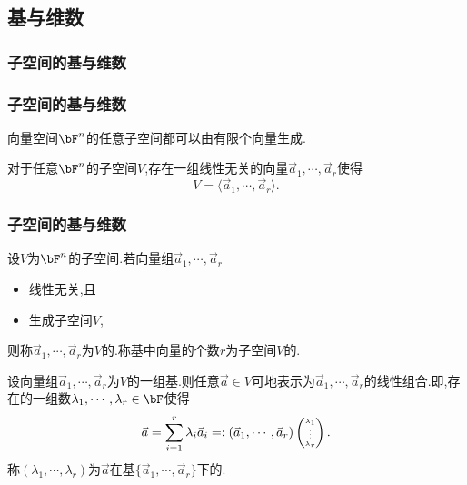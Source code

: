 




%











\subsection{基与维数}


\subsubsection{子空间的基与维数}
\begin{frame}\frametitle{子空间的基与维数}
\pp
\begin{theorem}
向量空间$\bF^n$的任意子空间都可以由有限个向量生成.
\end{theorem}
\pp
{}
\pp
\begin{corollary}
对于任意$\bF^n$的子空间$V$,存在一组线性无关的向量$\vec{a}_1,\cdots,\vec{a}_r$使得
\[V= \langle\vec{a}_1,\cdots,\vec{a}_r\rangle.\]
\end{corollary}
\end{frame}




\begin{frame}\frametitle{子空间的基与维数}
\pp
\begin{definition}[基]
设$V$为$\bF^n$的子空间.\pp 若向量组$\vec{a}_1,\cdots,\vec{a}_r$ \pp
\begin{itemize}
\item 线性无关,\pp 且
\item 生成子空间$V$,
\end{itemize}
\pp
则称$\vec{a}_1,\cdots,\vec{a}_r$为$V$的.\pp 称基中向量的个数$r$为子空间$V$的.
\end{definition}

\begin{proposition}[坐标]
设向量组$\vec{a}_1,\cdots,\vec{a}_r$为$V$的一组基.\pp  则任意$\vec{a}\in V$可地表示为$\vec{a}_1,\cdots,\vec{a}_r$的线性组合.\pp 即,存在的一组数$\lambda_1,\cdots,\lambda_r\in \bF$使得 \[\tiny \vec{a}=\sum_{i=1}^r\lambda_i\vec{a}_i=:(\vec{a}_1,\cdots,\vec{a}_r)\begin{pmatrix}\lambda_1\\\vdots\\\lambda_r\end{pmatrix}.\]
\pp
称$(\lambda_1,\cdots,\lambda_r)$为$\vec{a}$在基$\{\vec{a}_1,\cdots,\vec{a}_r\}$下的.
\end{proposition}
\end{frame}



